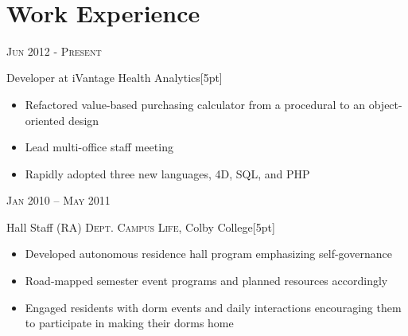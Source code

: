 \documentclass[10pt]{article} %
\begin{document}
\color{text1} %


\par{\\ %


\begin{minipage}[t]{0.5\textwidth}
\vspace{0pt} %


\section{Work Experience} 


{\raggedleft\textsc{Jun 2012 - Present}\par}

{\raggedright\large Developer at iVantage Health Analytics[5pt]}
\begin{itemize}
  \item Refactored value-based purchasing calculator from a procedural to an object-oriented design
  \item Lead multi-office staff meeting
  \item Rapidly adopted three new languages, 4D, SQL, and PHP
\end{itemize}


{\raggedleft\textsc{Jan 2010 -- May 2011}\par}

{\raggedright\large Hall Staff (RA) \textsc{Dept. Campus Life}, Colby College[5pt]}
\begin{itemize}
  \item Developed autonomous residence hall program emphasizing self-governance
  \item Road-mapped semester event programs and planned resources accordingly
  \item Engaged residents with dorm events and daily interactions encouraging them to participate in making their dorms home
\end{itemize}


\end{minipage}}
\end{document}

